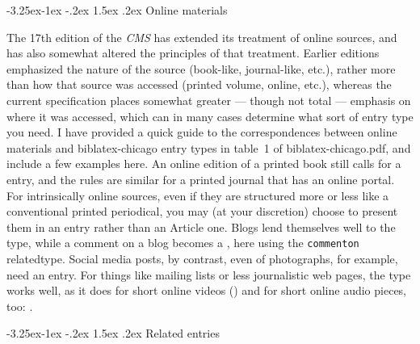 \documentclass[a4paper,12pt]{article}
\makeatletter
\renewcommand{\section}{\@startsection{section}{1}{\z@}%
                                     {-3.25ex\@plus -1ex \@minus -.2ex}%
                                     {1.5ex \@plus .2ex}%
                                     {\normalfont\large\bfseries}}
\makeatother
\begin{document}
\section{Online materials}
\label{sec:online}

\begin{refsection}

  The  17th edition of the
  \emph{CMS} has extended its treatment of online sources, and has
  also somewhat altered the principles of that treatment.  Earlier
  editions emphasized the nature of the source (book-like,
  journal-like, etc.), rather more than how that source was accessed
  (printed volume, online, etc.), whereas the current specification
  places somewhat greater --- though not total --- emphasis on where
  it was accessed, which can in many cases determine what sort of
  entry type you need.  I have provided a quick guide to the
  correspondences between online materials and
  \textsf{biblatex-chicago} entry types in table~1
   of \textsf{biblatex-chicago.pdf},
  and include a few examples here.  An online edition of a printed
  book still calls for a
   entry, and the
  rules are similar for a printed journal that has an online portal.
  For intrinsically online sources, even if they are structured more
  or less like a conventional printed periodical, you may (at your
  discretion) choose to present them in an
    entry rather than
  an \textsf{Article} one.  Blogs lend themselves well to the
   type, while a comment
  on a blog becomes a ,
  here using the \texttt{commenton} \textsf{relatedtype}.  Social
  media posts, by contrast, even of photographs, for example, need an
   entry.  For things
  like mailing lists or less journalistic web pages, the
   type works well, as
  it does for short online videos
  () and for short
  online audio pieces, too:
  .

  {\renewcommand{\notesname}{\normalsize Note Style} \theendnotes}
  \printbibliography[title=\normalsize Bibliography Style]
\end{refsection}

\section{Related entries}
\label{sec:related}
\end{document}
